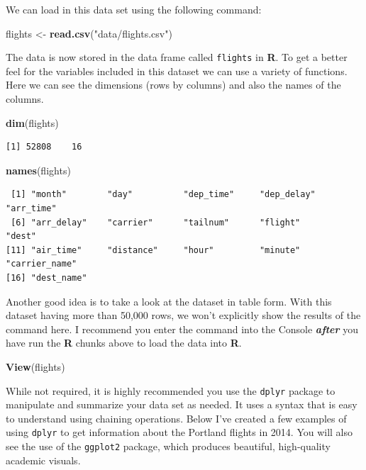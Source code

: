 \documentclass[12pt,twoside]{deuthesis}
\newenvironment{Shaded}{\begin{snugshade}}{\end{snugshade}}
\newcommand{\FunctionTok}[1]{\textcolor[rgb]{0.13,0.29,0.53}{\textbf{#1}}}
\newcommand{\NormalTok}[1]{#1}
\newcommand{\OtherTok}[1]{\textcolor[rgb]{0.56,0.35,0.01}{#1}}
\newcommand{\StringTok}[1]{\textcolor[rgb]{0.31,0.60,0.02}{#1}}
\begin{document}
We can load in this data set using the following command:
\begin{Shaded}
\begin{Highlighting}[]
\NormalTok{flights }\OtherTok{\textless{}{-}} \FunctionTok{read.csv}\NormalTok{(}\StringTok{"data/flights.csv"}\NormalTok{)}
\end{Highlighting}
\end{Shaded}
The data is now stored in the data frame called \texttt{flights} in \textbf{R}. To get a better feel for the variables included in this dataset we can use a variety of functions. Here we can see the dimensions (rows by columns) and also the names of the columns.
\begin{Shaded}
\begin{Highlighting}[]
\FunctionTok{dim}\NormalTok{(flights)}
\end{Highlighting}
\end{Shaded}
\begin{verbatim}
[1] 52808    16
\end{verbatim}
\begin{Shaded}
\begin{Highlighting}[]
\FunctionTok{names}\NormalTok{(flights)}
\end{Highlighting}
\end{Shaded}
\begin{verbatim}
 [1] "month"        "day"          "dep_time"     "dep_delay"    "arr_time"    
 [6] "arr_delay"    "carrier"      "tailnum"      "flight"       "dest"        
[11] "air_time"     "distance"     "hour"         "minute"       "carrier_name"
[16] "dest_name"   
\end{verbatim}
Another good idea is to take a look at the dataset in table form. With this dataset having more than 50,000 rows, we won't explicitly show the results of the command here. I recommend you enter the command into the Console \textbf{\emph{after}} you have run the \textbf{R} chunks above to load the data into \textbf{R}.
\begin{Shaded}
\begin{Highlighting}[]
\FunctionTok{View}\NormalTok{(flights)}
\end{Highlighting}
\end{Shaded}
While not required, it is highly recommended you use the \texttt{dplyr} package to manipulate and summarize your data set as needed. It uses a syntax that is easy to understand using chaining operations. Below I've created a few examples of using \texttt{dplyr} to get information about the Portland flights in 2014. You will also see the use of the \texttt{ggplot2} package, which produces beautiful, high-quality academic visuals.
\end{document}
